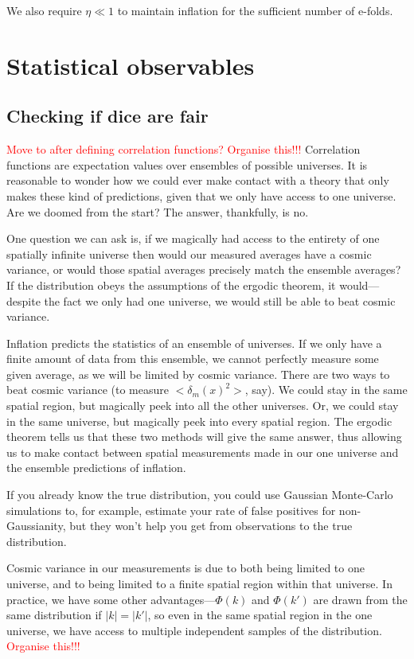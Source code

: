 We also require $\eta\ll1$ to maintain inflation for the sufficient number
of e-folds.


\newpage
\section{Statistical observables}
    \subsection{Checking if dice are fair}
\textcolor{red}{Move to after defining correlation functions?}
\textcolor{red}{Organise this!!!}
Correlation functions are expectation values over ensembles of possible
universes. It is reasonable to wonder how we could ever make contact with a theory
that only makes these kind of predictions, given that we only have access to one universe.
Are we doomed from the start? The answer, thankfully, is no.


One question we can ask is, if we magically had access to the entirety of one spatially infinite universe
then would our measured averages have a cosmic variance, or would those spatial averages
precisely match the ensemble averages?
If the distribution obeys the assumptions of the ergodic theorem, it would---despite
the fact we only had one universe, we would still be able to beat cosmic variance.


Inflation predicts the statistics of an ensemble of universes.
If we only have a finite amount of data from this ensemble,
we cannot perfectly measure some given average, as we will be limited by cosmic variance.
There are two ways to beat cosmic variance (to measure $<\delta_m(x)^2>$, say).
We could stay in the same spatial region, but magically peek into all the other universes.
Or, we could stay in the same universe, but magically peek into every spatial region.
The ergodic theorem tells us that these two methods will give the same answer,
thus allowing us to make contact between spatial measurements made in our one universe and the ensemble predictions of inflation.

  
If you already know the true distribution, you could use Gaussian Monte-Carlo simulations to,
for example, estimate your rate of false positives for non-Gaussianity,
but they won't help you get from observations to the true distribution. 


Cosmic variance in our measurements is due to both being limited to one universe, and to being
limited to a finite spatial region within that universe.
In practice, we have some other advantages---$\Phi(k)$ and $\Phi(k')$ are drawn from the same distribution if $|k|=|k'|$,
so even in the same spatial region in the one universe, we have access to multiple independent samples of the distribution.
\textcolor{red}{Organise this!!!}


